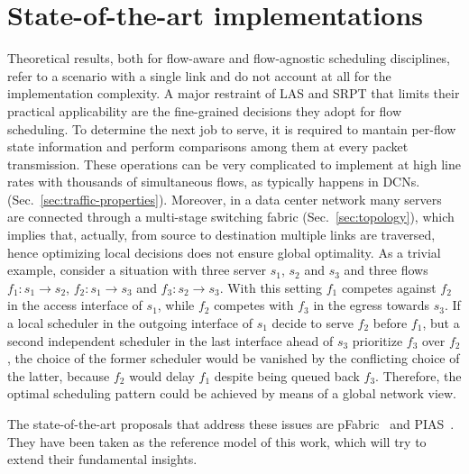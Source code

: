 \section{State-of-the-art implementations}
Theoretical results, both for flow-aware and flow-agnostic scheduling disciplines, refer to a scenario with a single link and do not account at all for the implementation complexity. A major restraint of LAS and SRPT that limits their practical applicability are the fine-grained decisions they adopt for flow scheduling. To determine the next job to serve, it is required to mantain per-flow state information and perform comparisons among them at every packet transmission. These operations can be very complicated to implement at high line rates with thousands of simultaneous flows, as typically happens in DCNs. (Sec.~\ref{sec:traffic-properties}). Moreover, in a data center network many servers are connected through a multi-stage switching fabric (Sec.~\ref{sec:topology}), which implies that, actually, from source to destination multiple links are traversed, hence optimizing local decisions does not ensure global optimality. As a trivial example, consider a situation with three server $s_1$, $s_2$ and $s_3$ and three flows $f_1:s_1 \longrightarrow s_2$, $f_2:s_1 \longrightarrow s_3$ and $f_3:s_2 \longrightarrow s_3$. With this setting $f_1$ competes against $f_2$ in the access interface of $s_1$, while $f_2$ competes with $f_3$ in the egress towards $s_3$. If a local scheduler in the outgoing interface of $s_1$ decide to serve $f_2$ before $f_1$, but a second independent scheduler in the last interface ahead of $s_3$ prioritize $f_3$ over $f_2$, the choice of the former scheduler would be vanished by the conflicting choice of the latter, because $f_2$ would delay $f_1$ despite being queued back $f_3$. Therefore, the optimal scheduling pattern could be achieved by means of a global network view. 

The state-of-the-art proposals that address these issues are pFabric~\cite{pFabric} and PIAS~\cite{pias}. They have been taken as the reference model of this work, which will try to extend their fundamental insights.  

